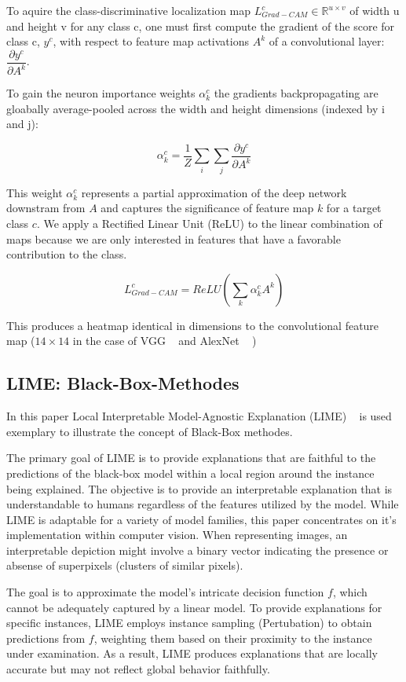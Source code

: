 \documentclass{article}
\begin{document}
To aquire the class-discriminative localization map \( L_{Grad-CAM}^{c} \in \mathds{R}^{ u \times v} \) of width u and height v for any class c, one must first compute the gradient of the score for class c, \(y^c\), with respect to feature map activations \(A^k\) of a convolutional layer: \( \dfrac{ \partial y^c}{ \partial A^k} \). 

To gain the neuron importance weights \(\alpha^c_k\) the gradients backpropagating are gloabally average-pooled across the width and height dimensions (indexed by i and j): 

\[ \alpha^c_k = \dfrac{1}{Z}\sum_{i} \sum_{j} \dfrac{\partial y^c}{\partial A^k}  \]

This weight $\alpha^c_k$ represents a partial approximation of the deep network downstram from $A$ and captures the significance of feature map $k$ for a target class $c$. We apply a Rectified Linear Unit (ReLU) to the linear combination of maps because we are only interested in features that have a favorable contribution to the class. 

\[ L_{Grad-CAM}^{c} = ReLU ( \sum_{k} \alpha^c_k A^k ) \]

This produces a heatmap identical in dimensions to the convolutional feature map ($14 \times 14$ in the case of VGG ~\cite{simonyan2015deep} and AlexNet ~\cite{krizhevsky2012} )





\subsection{LIME: Black-Box-Methodes}
In this paper Local Interpretable Model-Agnostic Explanation (LIME) ~\cite{ribeiro2016why} is used exemplary to illustrate the concept of Black-Box methodes.

The primary goal of LIME is to provide explanations that are faithful to the predictions of the black-box model within a local region around the instance being explained. The objective is to provide an interpretable explanation that is understandable to humans regardless of the features utilized by the model. 
While LIME is adaptable for a variety of model families, this paper concentrates on it's implementation within computer vision. 
When representing images, an interpretable depiction might involve a binary vector indicating the presence or absense of superpixels (clusters of similar pixels).

The goal is to approximate the model's intricate decision function $f$, which cannot be adequately captured by a linear model. To provide explanations for specific instances, LIME employs instance sampling (Pertubation) to obtain predictions from $f$, weighting them based on their proximity to the instance under examination. As a result, LIME produces explanations that are locally accurate but may not reflect global behavior faithfully.
\end{document}
